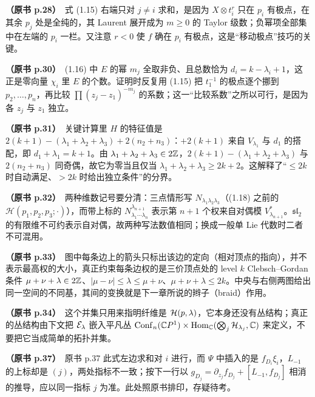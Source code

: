 \noindent \textbf{（原书 p.28）}\ 式 (1.15) 右端只对 $j\ne i$ 求和，是因为 $X\otimes t_i^{r}$ 只在 $p_i$ 有极点，在其余 $p_j$ 处是全纯的，其 Laurent 展开成为 $m\ge0$ 的 Taylor 级数；负幂项全部集中在左端的 $p_i$ 一栏。又注意 $r<0$ 使 $f$ 确在 $p_i$ 有极点，这是“移动极点”技巧的关键。\par\smallskip

\noindent \textbf{（原书 p.30）}\ (1.16) 中 $E$ 的幂 $m_j$ 全取非负、且总数恰为 $d_i=k-\lambda_i+1$，这正是零向量 $\chi_i$ 里 $E$ 的个数。证明时反复用 (1.15) 把 $t_1^{-1}$ 的极点逐个挪到 $p_2,\dots,p_n$，再比较 $\prod(z_j-z_1)^{-m_j}$ 的系数；这一“比较系数”之所以可行，是因为各 $z_j$ 与 $z_1$ 独立。\par\smallskip

\noindent \textbf{（原书 p.31）}\ 关键计算里 $H$ 的特征值是 $2(k+1)-(\lambda_1+\lambda_2+\lambda_3)+2(n_2+n_3)$：$+2(k+1)$ 来自 $V_{\lambda_1}$ 与 $d_1$ 的搭配，即 $d_1+\lambda_1=k+1$。由 $\lambda_1+\lambda_2+\lambda_3\in2\mathbb{Z}$，$2(k+1)-(\lambda_1+\lambda_2+\lambda_3)$ 与 $2(n_2+n_3)$ 同奇偶，故它为零当且仅当 $\lambda_1+\lambda_2+\lambda_3\ge2k+2$。这解释了“$\le 2k$ 时自动满足、$>2k$ 时给出独立条件”的分界。\par\smallskip

\noindent \textbf{（原书 p.32）}\ 两种维数记号要分清：三点情形写 $N_{\lambda_1\lambda_2\lambda_3}$（(1.18) 之前的 $\mathcal{H}(p_1,p_2,p_3;\cdot)$），而带上标的 $N^{\lambda_{n+1}}_{\lambda_1\cdots\lambda_n}$ 表示第 $n+1$ 个权来自对偶模 $V^{*}_{\lambda_{n+1}}$。$\mathfrak{sl}_2$ 的有限维不可约表示自对偶，故两种写法数值相同；换成一般单 Lie 代数时二者不可混用。\par\smallskip

\noindent \textbf{（原书 p.33）}\ 图中每条边上的箭头只标出该边的定向（相对顶点的指向），并不表示最高权的大小，真正约束每条边权的是三价顶点处的 level $k$ Clebsch--Gordan 条件 $\mu+\nu+\lambda\in2\mathbb{Z}$、$|\mu-\nu|\le\lambda\le\mu+\nu$、$\mu+\nu+\lambda\le2k$。中央与右侧两图给出同一空间的不同基，其间的变换就是下一章所说的辫子（braid）作用。\par\smallskip

\noindent \textbf{（原书 p.34）}\ 这个并集只用来指明纤维是 $\mathcal{H}(p,\lambda)$，它本身还没有丛结构；真正的丛结构由下文把 $\mathcal{E}_\lambda$ 嵌入平凡丛 $\operatorname{Conf}_n(\mathbb{C}P^1)\times\operatorname{Hom}_{\mathbb{C}}(\bigotimes_j\mathcal{H}_{\lambda_j},\mathbb{C})$ 来定义，不要把它当成简单的拓扑并集。\par\smallskip

\noindent \textbf{（原书 p.37）}\ 原书 p.37 此式左边求和对 $i$ 进行，而 $\Psi$ 中插入的是 $f_{D_i}\xi_i$，$L_{-1}$ 的上标却是 $(j)$，两处指标不一致；按下一行以 $g_{D_j}=\partial_{z_j}f_{D_j}+[L_{-1},f_{D_j}]$ 相消的推导，应以同一指标 $j$ 为准。此处照原书排印，存疑待考。\par\smallskip

